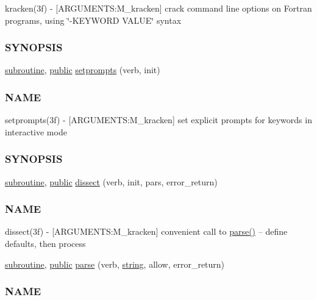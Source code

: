 \begin{DoxyCompactItemize}
\begin{DoxyCompactList}
kracken(3f) -\/ \mbox{[}A\+R\+G\+U\+M\+E\+N\+TS\+:M\+\_\+kracken\mbox{]} crack command line options on Fortran programs, using \char`\"{}-\/\+K\+E\+Y\+W\+O\+R\+D V\+A\+L\+U\+E\char`\"{} syntax \subsubsection*{S\+Y\+N\+O\+P\+S\+IS}\end{DoxyCompactList}\item 
\hyperlink{M__stopwatch_83_8txt_acfbcff50169d691ff02d4a123ed70482}{subroutine}, \hyperlink{M__stopwatch_83_8txt_a2f74811300c361e53b430611a7d1769f}{public} \hyperlink{namespacem__kracken_aab831b470a3107ca69833e717e95eaec}{setprompts} (verb, init)
\begin{DoxyCompactList}\small\item\em \subsubsection*{N\+A\+ME}

setprompts(3f) -\/ \mbox{[}A\+R\+G\+U\+M\+E\+N\+TS\+:M\+\_\+kracken\mbox{]} set explicit prompts for keywords in interactive mode \subsubsection*{S\+Y\+N\+O\+P\+S\+IS}\end{DoxyCompactList}\item 
\hyperlink{M__stopwatch_83_8txt_acfbcff50169d691ff02d4a123ed70482}{subroutine}, \hyperlink{M__stopwatch_83_8txt_a2f74811300c361e53b430611a7d1769f}{public} \hyperlink{namespacem__kracken_a2cb376f8a8e26e489a45cafcda66ea3e}{dissect} (verb, init, pars, error\+\_\+return)
\begin{DoxyCompactList}\small\item\em \subsubsection*{N\+A\+ME}

dissect(3f) -\/ \mbox{[}A\+R\+G\+U\+M\+E\+N\+TS\+:M\+\_\+kracken\mbox{]} convenient call to \hyperlink{namespacem__kracken_a495ed7db5c2d301c4d5e623b62a9c295}{parse()} -- define defaults, then process \end{DoxyCompactList}\item 
\hyperlink{M__stopwatch_83_8txt_acfbcff50169d691ff02d4a123ed70482}{subroutine}, \hyperlink{M__stopwatch_83_8txt_a2f74811300c361e53b430611a7d1769f}{public} \hyperlink{namespacem__kracken_a495ed7db5c2d301c4d5e623b62a9c295}{parse} (verb, \hyperlink{what__overview_81_8txt_a74cb7e955273b9f9157b4f0c18a38849}{string}, allow, error\+\_\+return)
\begin{DoxyCompactList}\small\item\em \subsubsection*{N\+A\+ME}


\end{DoxyCompactList}
\end{DoxyCompactItemize}
